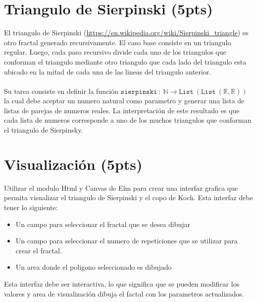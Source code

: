 \documentclass{article}
\begin{document}
\section*{Triangulo de Sierpinski (5pts)}
El triangulo de Sierpinski (\url{https://en.wikipedia.org/wiki/Sierpinski_triangle}) es otro fractal generado recursivamente.
El caso base consiste en un triangulo regular. Luego, cada paso recursivo divide cada uno de los triangulos que
conforman el triangulo mediante otro triangulo que cada lado del triangulo esta ubicado en
la mitad de cada una de las lineas del triangulo anterior.
\\\\
Su tarea consiste en definir la funci\'on $\mathtt{sierpinski}\ :\ \mathbb{N}\rightarrow \mathtt{List}\ 
(\mathtt{List}\ (\mathbb{R}, \mathbb{R}))$ la cual debe aceptar un numero natural como parametro y generar
una lista de listas de parejas de numeros reales. La interpretaci\'on de este resultado es que cada
lista de numeros corresponde a uno de los muchos triangulos que conforman el triangulo de Sierpinsky. 

\section*{Visualizaci\'on (5pts)}

Utilizar el modulo Html y Canvas de Elm para crear una interfaz grafica que permita visualizar el
triangulo de Sierpinski y el copo de Koch. Esta interfaz debe tener lo siguiente:
\begin{itemize}
    \item{Un campo para seleccionar el fractal que se desea dibujar}
    \item{Un campo para seleccionar el numero de repeticiones que se utilizar
    para crear el fractal.}
    \item{Un area donde el poligono seleccionado es dibujado}
\end{itemize}

Esta interfaz debe ser interactiva, lo que significa que se pueden modificar
los valores y area de visualizaci\'on dibuja el factal con los parametros
actualizados.
\end{document}
